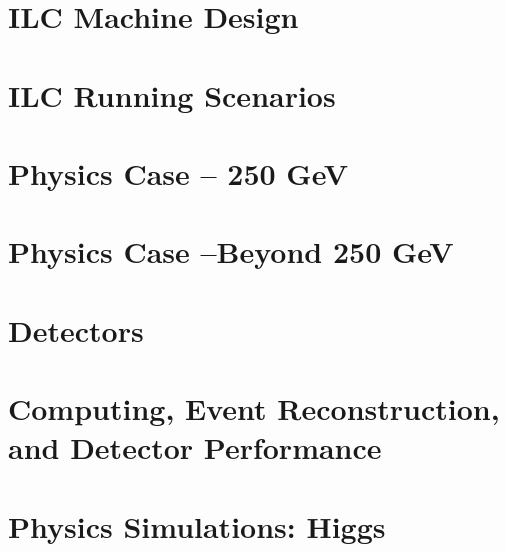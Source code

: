 \documentclass[%
reprint,
nofootinbib,
 amsmath,amssymb,
 aps,
]{revtex4-1}
\begin{document}
   
   

   
\section{\label{sec:ilc}ILC Machine Design}

  
  

  
\section{\label{sec:runscenarios}ILC Running Scenarios  }
  
   

   
   
\section{\label{sec:physics}Physics Case -- 250 GeV }


 


\section{\label{sec:highenergy}Physics Case --Beyond 250 GeV }


 


 
\section{\label{sec:detectors}Detectors }


\section{\label{sec:software} Computing, Event Reconstruction, and
  Detector Performance}

  
   
   

\section{\label{sec:higgs}Physics Simulations: Higgs
}


 
  
 
\end{document}

